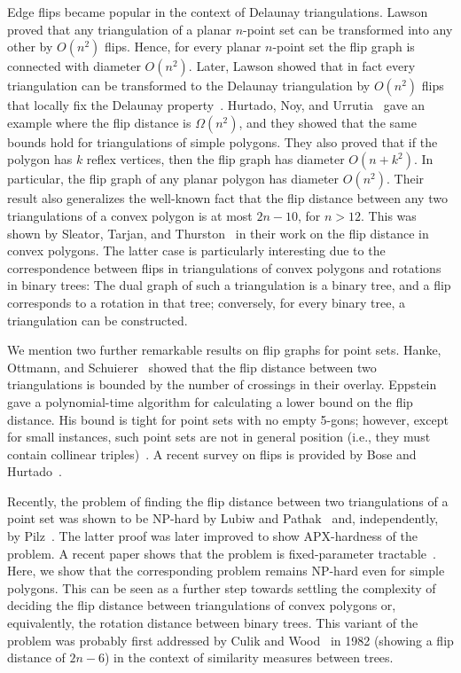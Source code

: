 \documentclass[a4paper,11pt]{article}
\begin{document}
Edge flips became popular in the context of Delaunay
triangulations.  Lawson~\cite{lawson_connected} proved that any triangulation
of a planar $n$-point set can be transformed into any other by $O(n^2)$ flips. 
Hence, for every planar $n$-point set the flip graph 
is connected with diameter $O(n^2)$.
Later, Lawson showed that in fact every triangulation can be transformed to the Delaunay
triangulation by $O(n^2)$ flips that locally fix the Delaunay 
property~\cite{lawson_delaunay}. 
Hurtado, Noy, and Urrutia~\cite{hurtado_noy_urrutia} gave an example where the 
flip distance is $\Omega(n^2)$, 
and they showed that the same bounds hold for triangulations of simple polygons.
They also proved that if the polygon has $k$ reflex vertices, then
the flip graph has diameter $O(n + k^2)$. In particular, the flip graph of
any planar polygon has diameter $O(n^2)$.  Their result also generalizes the
well-known fact that the flip distance between any two triangulations of a
convex polygon is at most $2n - 10$, for $n > 12$. This was shown by Sleator, Tarjan, and Thurston~\cite{sleator} in their work on the flip distance in convex polygons.
The latter case is particularly 
interesting due to the correspondence between flips in triangulations of
convex polygons and rotations in binary trees:
The dual graph of such a triangulation is a binary tree, and a flip 
corresponds to a rotation in that tree; conversely, for every 
binary tree, a triangulation can be constructed.

We mention two further remarkable results on 
flip graphs for point sets.  Hanke, Ottmann, and
Schuierer~\cite{edge_flipping_distance} showed that the flip distance between
two triangulations is bounded by the number of crossings in their overlay. 
Eppstein~\cite{eppstein} gave a
polynomial-time algorithm for calculating a lower bound on the flip distance.
His bound is tight for point sets with no empty 5-gons; however, except for
small instances, such point sets are not in general position (i.e.,
they must contain collinear triples)~\cite{empty5gon}. 
A recent survey on flips is provided by Bose and Hurtado~\cite{survey}.

Recently, the problem of finding the flip distance between two triangulations of a
point set was shown to be NP-hard by Lubiw and
Pathak~\cite{lubiw} and, independently, by Pilz~\cite{point_set_hard}.
The latter proof was later improved to show APX-hardness of the problem.
A recent paper shows that the problem is fixed-parameter tractable~\cite{flip_distance_fpt}.
Here, we show that the corresponding problem remains NP-hard even for simple polygons.
This can be seen as a further step towards settling the complexity
of deciding the flip distance between triangulations of convex polygons or, equivalently, the rotation distance between binary trees.
This variant of the problem was probably first addressed by Culik and 
Wood~\cite{tree_similarity} in 1982 (showing a flip distance of $2n-6$) in the context of similarity measures between trees.
\end{document}
